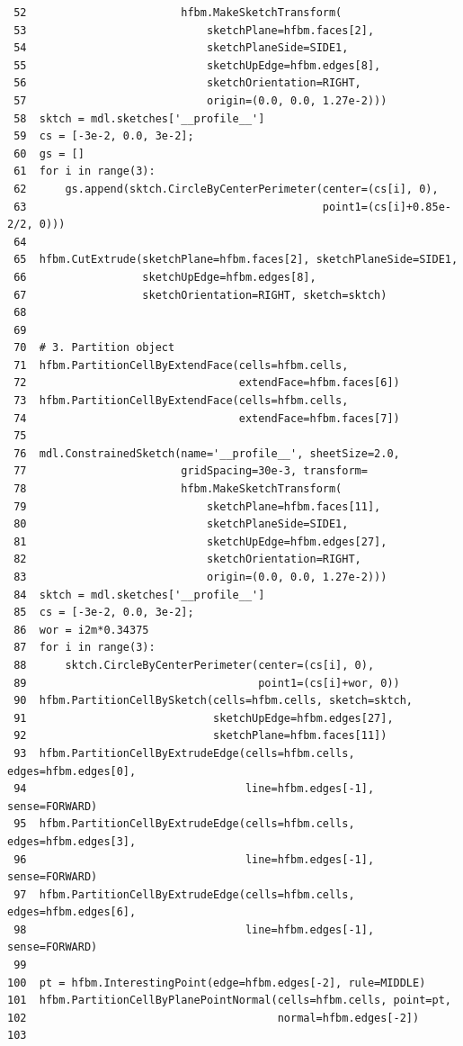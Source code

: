 \documentclass[11pt]{article}
\begin{document}
\begin{enumerate}
\begin{verbatim}
 52                        hfbm.MakeSketchTransform(
 53                            sketchPlane=hfbm.faces[2],
 54                            sketchPlaneSide=SIDE1,
 55                            sketchUpEdge=hfbm.edges[8],
 56                            sketchOrientation=RIGHT,
 57                            origin=(0.0, 0.0, 1.27e-2)))
 58  sktch = mdl.sketches['__profile__']
 59  cs = [-3e-2, 0.0, 3e-2];
 60  gs = []
 61  for i in range(3):
 62      gs.append(sktch.CircleByCenterPerimeter(center=(cs[i], 0),
 63                                              point1=(cs[i]+0.85e-2/2, 0)))
 64  
 65  hfbm.CutExtrude(sketchPlane=hfbm.faces[2], sketchPlaneSide=SIDE1,
 66                  sketchUpEdge=hfbm.edges[8],
 67                  sketchOrientation=RIGHT, sketch=sktch)
 68  
 69  
 70  # 3. Partition object
 71  hfbm.PartitionCellByExtendFace(cells=hfbm.cells,
 72                                 extendFace=hfbm.faces[6])
 73  hfbm.PartitionCellByExtendFace(cells=hfbm.cells,
 74                                 extendFace=hfbm.faces[7])
 75  
 76  mdl.ConstrainedSketch(name='__profile__', sheetSize=2.0,
 77                        gridSpacing=30e-3, transform=
 78                        hfbm.MakeSketchTransform(
 79                            sketchPlane=hfbm.faces[11],
 80                            sketchPlaneSide=SIDE1,
 81                            sketchUpEdge=hfbm.edges[27],
 82                            sketchOrientation=RIGHT,
 83                            origin=(0.0, 0.0, 1.27e-2)))
 84  sktch = mdl.sketches['__profile__']
 85  cs = [-3e-2, 0.0, 3e-2];
 86  wor = i2m*0.34375
 87  for i in range(3):
 88      sktch.CircleByCenterPerimeter(center=(cs[i], 0),
 89                                    point1=(cs[i]+wor, 0))
 90  hfbm.PartitionCellBySketch(cells=hfbm.cells, sketch=sktch,
 91                             sketchUpEdge=hfbm.edges[27],
 92                             sketchPlane=hfbm.faces[11])
 93  hfbm.PartitionCellByExtrudeEdge(cells=hfbm.cells, edges=hfbm.edges[0],
 94                                  line=hfbm.edges[-1], sense=FORWARD)
 95  hfbm.PartitionCellByExtrudeEdge(cells=hfbm.cells, edges=hfbm.edges[3],
 96                                  line=hfbm.edges[-1], sense=FORWARD)
 97  hfbm.PartitionCellByExtrudeEdge(cells=hfbm.cells, edges=hfbm.edges[6],
 98                                  line=hfbm.edges[-1], sense=FORWARD)
 99  
100  pt = hfbm.InterestingPoint(edge=hfbm.edges[-2], rule=MIDDLE)
101  hfbm.PartitionCellByPlanePointNormal(cells=hfbm.cells, point=pt,
102                                       normal=hfbm.edges[-2])
103  

\end{verbatim}
\end{enumerate}
\end{document}
